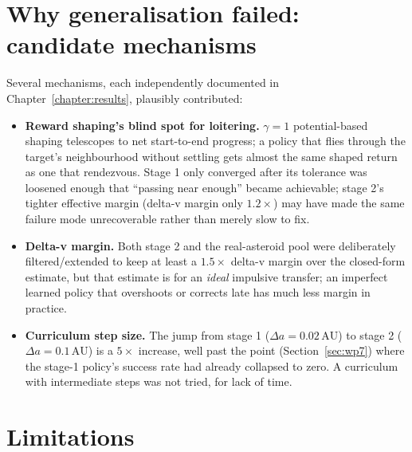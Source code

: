 \section{Why generalisation failed: candidate mechanisms}

Several mechanisms, each independently documented in Chapter~\ref{chapter:results}, plausibly
contributed:

\begin{itemize}
  \item \textbf{Reward shaping's blind spot for loitering.} $\gamma=1$ potential-based shaping
        telescopes to net start-to-end progress; a policy that flies through the target's
        neighbourhood without settling gets almost the same shaped return as one that
        rendezvous. Stage 1 only converged after its tolerance was loosened enough that
        ``passing near enough'' became achievable; stage 2's tighter effective margin
        (delta-v margin only $1.2\times$) may have made the same failure mode unrecoverable
        rather than merely slow to fix.
  \item \textbf{Delta-v margin.} Both stage 2 and the real-asteroid pool were deliberately
        filtered/extended to keep at least a $1.5\times$ delta-v margin over the closed-form
        estimate, but that estimate is for an \emph{ideal} impulsive transfer; an imperfect
        learned policy that overshoots or corrects late has much less margin in practice.
  \item \textbf{Curriculum step size.} The jump from stage 1 ($\Delta a=0.02\,\mathrm{AU}$) to
        stage 2 ($\Delta a=0.1\,\mathrm{AU}$) is a $5\times$ increase, well past the point
        (Section~\ref{sec:wp7}) where the stage-1 policy's success rate had already collapsed to
        zero. A curriculum with intermediate steps was not tried, for lack of time.
\end{itemize}

\section{Limitations}


